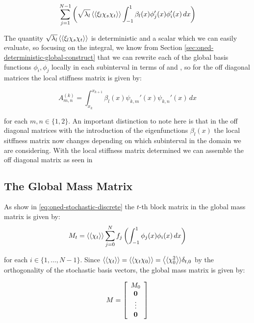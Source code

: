 \begin{equation}
    \sum_{j=1}^{N - 1}\left(\sqrt{\lambda_l}\left\langle\langle\xi_l\chi_s\chi_t\right\rangle\rangle
        \int_{-1}^1\beta_l(x)\phi_j'(x)\phi_i'(x)\, dx\right)
\end{equation}

The quantity $\sqrt{\lambda_l}\left\langle\langle\xi_l\chi_s\chi_t\right\rangle\rangle$ is deterministic and
a scalar which we can easily evaluate, so focusing on the integral, we know
from Section \ref{sec:oned-deterministic-global-construct} that we can rewrite
each of the global basis functions $\phi_i,\phi_j$ locally in each subinterval
in terms of  and
, so for the off diagonal matrices the local
stiffness matrix is given by:

\begin{equation}
    A^{(k)}_{m,n} = \int_{x_k}^{x_{k+1}}
        \beta_l(x)\psi_{k,m}'(x)\psi_{k,n}'(x)\, dx
\end{equation}

for each $m, n \in \{1, 2\}$. An important distinction to note here is that in
the off diagonal matrices with the introduction of the eigenfunctions
$\beta_l(x)$ the local sitffness matrix now changes depending on which
subinterval in the domain we are considering. With the local stiffness matrix
determined we can assemble the off diagonal matrix as seen in

\subsection{The Global Mass Matrix}

As show in \ref{eq:oned-stochastic-discrete} the $t$-th block matrix in the
global mass matrix is given by:
\begin{equation}
    M_t = \left\langle\langle\chi_t\right\rangle\rangle\sum_{j=0}^Nf_j\left(
        \int_{-1}^1\phi_j(x)\phi_i(x)\, dx\right)
\end{equation}

for each $i \in \{1,\ldots,N-1\}$. Since $\left\langle\langle\chi_t\right\rangle\rangle =
\left\langle\langle\chi_t\chi_0\right\rangle\rangle = \left\langle\langle\chi_0^2\right\rangle\rangle\delta_{t, 0}$ by the orthogonality of
the stochastic basis vectors, the global mass matrix is given by:

\begin{equation}
    M = \left[\begin{array}{c}
        M_0 \\ \mathbf{0} \\ \vdots \\ \mathbf{0}
    \end{array}\right]
\end{equation}

